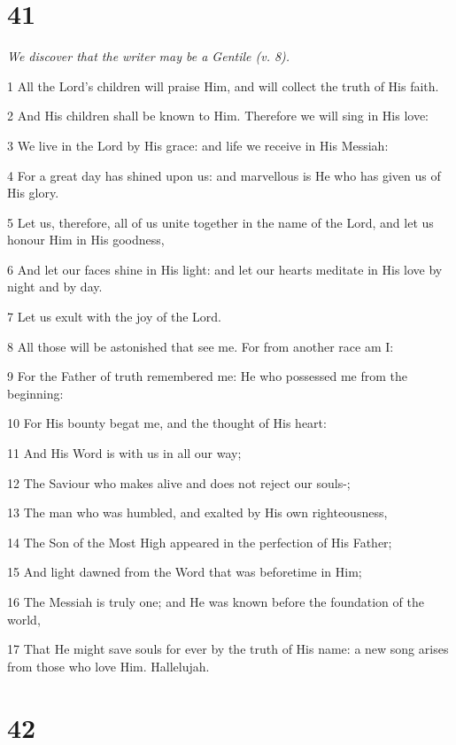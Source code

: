 \chapter{41}

\par \textit{We discover that the writer may be a Gentile (v. 8).}

\par 1 All the Lord's children will praise Him, and will collect the truth of His faith.
\par 2 And His children shall be known to Him. Therefore we will sing in His love:
\par 3 We live in the Lord by His grace: and life we receive in His Messiah:
\par 4 For a great day has shined upon us: and marvellous is He who has given us of His glory.
\par 5 Let us, therefore, all of us unite together in the name of the Lord, and let us honour Him in His goodness,
\par 6 And let our faces shine in His light: and let our hearts meditate in His love by night and by day.
\par 7 Let us exult with the joy of the Lord.
\par 8 All those will be astonished that see me. For from another race am I:
\par 9 For the Father of truth remembered me: He who possessed me from the beginning:
\par 10 For His bounty begat me, and the thought of His heart:
\par 11 And His Word is with us in all our way;
\par 12 The Saviour who makes alive and does not reject our souls-;
\par 13 The man who was humbled, and exalted by His own righteousness,
\par 14 The Son of the Most High appeared in the perfection of His Father;
\par 15 And light dawned from the Word that was beforetime in Him;
\par 16 The Messiah is truly one; and He was known before the foundation of the world,
\par 17 That He might save souls for ever by the truth of His name: a new song arises from those who love Him. Hallelujah.

\chapter{42}

